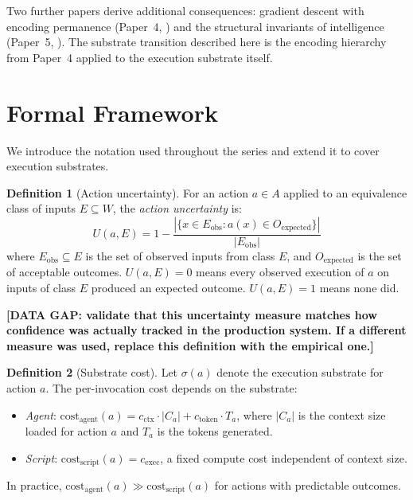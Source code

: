 \documentclass[11pt]{article}
\theoremstyle{definition}
\newtheorem{definition}{Definition}
\begin{document}
Two further papers derive additional consequences: gradient descent
with encoding permanence (Paper~4, \cite{McCarthy2026d}) and the
structural invariants of intelligence (Paper~5, \cite{McCarthy2026e}).
The substrate transition described here is the encoding hierarchy from
Paper~4 applied to the execution substrate itself.

\section{Formal Framework}
\label{sec:framework}

We introduce the notation used throughout the series and extend it
to cover execution substrates.

\begin{definition}[Action uncertainty]
\label{def:uncertainty}
For an action $a \in A$ applied to an equivalence class of inputs
$E \subseteq W$, the \emph{action uncertainty} is:
\[
U(a, E) = 1 - \frac{|\{x \in E_{\text{obs}} : a(x) \in O_{\text{expected}}\}|}{|E_{\text{obs}}|}
\]
where $E_{\text{obs}} \subseteq E$ is the set of observed inputs from
class $E$, and $O_{\text{expected}}$ is the set of acceptable outcomes.
$U(a, E) = 0$ means every observed execution of $a$ on inputs of class
$E$ produced an expected outcome. $U(a, E) = 1$ means none did.
\end{definition}

\textbf{[DATA GAP: validate that this uncertainty measure matches how
confidence was actually tracked in the production system. If a different
measure was used, replace this definition with the empirical one.]}

\begin{definition}[Substrate cost]
\label{def:substrate-cost}
Let $\sigma(a)$ denote the execution substrate for action $a$. The
per-invocation cost depends on the substrate:
\begin{itemize}
\item \emph{Agent}: $\text{cost}_{\text{agent}}(a) = c_{\text{ctx}}
   \cdot |C_a| + c_{\text{token}} \cdot T_a$, where $|C_a|$ is the
   context size loaded for action $a$ and $T_a$ is the tokens generated.
\item \emph{Script}: $\text{cost}_{\text{script}}(a) = c_{\text{exec}}$,
   a fixed compute cost independent of context size.
\end{itemize}
In practice, $\text{cost}_{\text{agent}}(a) \gg
\text{cost}_{\text{script}}(a)$ for actions with predictable outcomes.
\end{definition}
\end{document}
